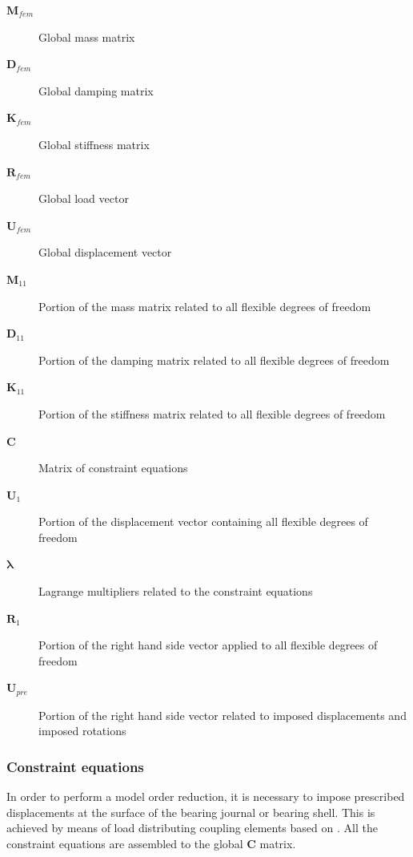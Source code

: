 \begin{description}
\item[$\boldsymbol{M}_{fem}$] Global mass matrix
\item[$\boldsymbol{D}_{fem}$] Global damping matrix
\item[$\boldsymbol{K}_{fem}$] Global stiffness matrix
\item[$\boldsymbol{R}_{fem}$] Global load vector
\item[$\boldsymbol{U}_{fem}$] Global displacement vector
\item[$\boldsymbol{M}_{11}$] Portion of the mass matrix related to all flexible degrees of freedom
\item[$\boldsymbol{D}_{11}$] Portion of the damping matrix related to all flexible degrees of freedom
\item[$\boldsymbol{K}_{11}$] Portion of the stiffness matrix related to all flexible degrees of freedom
\item[$\boldsymbol{C}$] Matrix of constraint equations
\item[$\boldsymbol{U}_1$] Portion of the displacement vector containing all flexible degrees of freedom
\item[$\boldsymbol{\lambda}$] Lagrange multipliers related to the constraint equations
\item[$\boldsymbol{R}_1$] Portion of the right hand side vector applied to all flexible degrees of freedom
\item[$\boldsymbol{U}_{pre}$] Portion of the right hand side vector related to imposed displacements and imposed rotations
\end{description}
\subsubsection{Constraint equations}
In order to perform a model order reduction, it is necessary to impose prescribed displacements at the surface of the bearing journal or bearing shell. This is achieved by means of load distributing coupling elements based on \cite{CODEASTERR30308}. All the constraint equations are assembled to the global $\boldsymbol{C}$ matrix.

